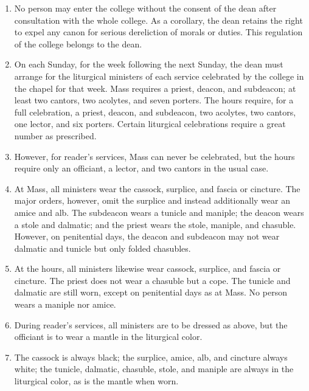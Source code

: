 \begin{enumerate}
			\item No person may enter the college without the consent of the dean after consultation with the whole college. As a corollary, the dean retains the right to expel any canon for serious dereliction of morals or duties. This regulation of the college belongs to the dean.
			
			\item On each Sunday, for the week following the next Sunday, the dean must arrange for the liturgical ministers of each service celebrated by the college in the chapel for that week. Mass requires a priest, deacon, and subdeacon; at least two cantors, two acolytes, and seven porters. The hours require, for a full celebration, a priest, deacon, and subdeacon, two acolytes, two cantors, one lector, and six porters. Certain liturgical celebrations require a great number as prescribed. 
			
			\item However, for reader's services, Mass can never be celebrated, but the hours require only an officiant, a lector, and two cantors in the usual case.
				
			
			\item At Mass, all ministers wear the cassock, surplice, and fascia or cincture. The major orders, however, omit the surplice and instead additionally wear an amice and alb. The subdeacon wears a tunicle and maniple; the deacon wears a stole and dalmatic; and the priest wears the stole, maniple, and chasuble. However, on penitential days, the deacon and subdeacon may not wear dalmatic and tunicle but only folded chasubles.
			
			\item At the hours, all ministers likewise wear cassock, surplice, and fascia or cincture. The priest does not wear a chasuble but a cope. The tunicle and dalmatic are still worn, except on penitential days as at Mass. No person wears a maniple nor amice.
			
			\item During reader's services, all ministers are to be dressed as above, but the officiant is to wear a mantle in the liturgical color.
			
			\item The cassock is always black; the surplice, amice, alb, and cincture always white; the tunicle, dalmatic, chasuble, stole, and maniple are always in the liturgical color, as is the mantle when worn.
			

\end{enumerate}
